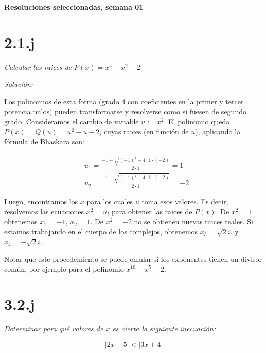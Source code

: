 \documentclass[10pt,a4paper]{article}
\begin{document}
\vspace{0,3cm}

\begin{center}
{\bf \Large Resoluciones seleccionadas, semana 01}
\end{center}

\vspace{0,3cm}

\section*{2.1.j}\emph{Calcular las raices de $P(x) = x^4-x^2-2$}


\noindent
\emph{Solución:}


\noindent
Los polinomios de esta forma (grado 4 con coeficientes en la primer y tercer
potencia nulos) pueden transformarse y resolverse como si fuesen de segundo
grado.
Consideramos el cambio de variable
$u := x^2$. El polinomio queda $P(x) = Q(u) = u^2-u-2$,
cuyas raices (en función de $u$), aplicando la f\'ormula
de Bhaskara son:

\begin{equation*}
  \begin{split}
    &u_1 = \frac{-1 + \sqrt{(-1)^2-4\cdot 1 \cdot (-2)}}{2 \cdot 1} = 1\\
    &u_2 = \frac{-1 - \sqrt{(-1)^2-4\cdot 1 \cdot (-2)}}{2 \cdot 1} = -2
  \end{split}
\end{equation*}

\noindent
Luego, encontramos los $x$ para los cuales $u$ toma esos valores.
Es decir, resolvemos las ecuaciones $x^2 = u_i$
para obtener las raices de $P(x)$.
De $x^2=1$ obtenemos $x_1=-1$, $x_2 = 1$. De $x^2=-2$ no se obtienen nuevas
raices reales. Si estamos trabajando en el cuerpo de los complejos,
obtenemos
$x_3 = \sqrt{2} i$, y $x_4 = -\sqrt{2} i$.

\noindent
Notar que este procedemiento se puede emular si los exponentes tienen
un divisor común, por ejemplo para el polinomio $x^{10} - x^{5} - 2$.

\section*{3.2.j}
\emph{Determinar para qué valores de $x$ es cierta la siguiente inecuaci\'on:}

\begin{equation*}
  \vert 2x - 5 \vert  <  \vert 3x + 4 \vert
\end{equation*}
\end{document}
